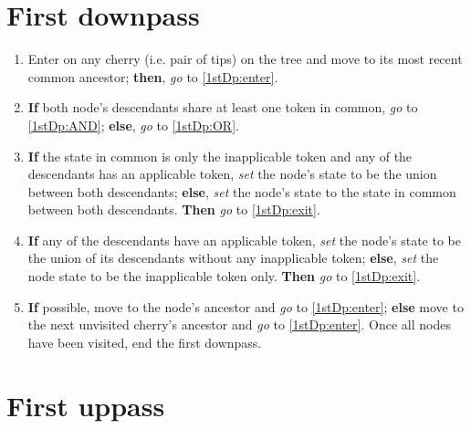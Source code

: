 \documentclass[a4paper,12pt]{article}
\begin{document}

\section{First downpass} \label{1stDp}


\begin{enumerate}
    \item Enter on any cherry (i.e. pair of tips) on the tree and move to its most recent common ancestor; \textbf{then}, \textit{go} to \ref{1stDp:enter}.
    \item \label{1stDp:enter} \textbf{If} both node's descendants share at least one token in common, \textit{go} to \ref{1stDp:AND}; \textbf{else}, \textit{go} to \ref{1stDp:OR}.
    \item \label{1stDp:AND} \textbf{If} the state in common is only the inapplicable token and any of the descendants has an applicable token, \textit{set} the node's state to be the union between both descendants; \textbf{else}, \textit{set} the node's state to the state in common between both descendants. \textbf{Then} \textit{go} to \ref{1stDp:exit}.  
    \item \label{1stDp:OR} \textbf{If} any of the descendants have an applicable token, \textit{set} the node's state to be the union of its descendants without any inapplicable token; \textbf{else}, \textit{set} the node state to be the inapplicable token only. \textbf{Then} \textit{go} to \ref{1stDp:exit}.
    \item \label{1stDp:exit} \textbf{If} possible, move to the node's ancestor and \textit{go} to \ref{1stDp:enter}; \textbf{else} move to the next unvisited cherry's ancestor and \textit{go} to \ref{1stDp:enter}. Once all nodes have been visited, end the first downpass.
\end{enumerate}

\section{First uppass} \label{1stUp}
\end{document}
